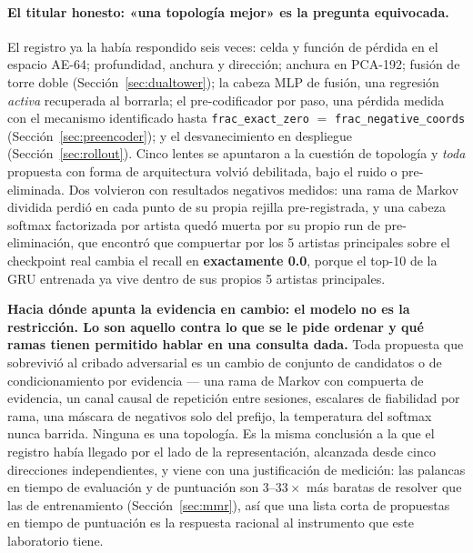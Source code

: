 \documentclass[11pt]{article}
\begin{document}
\paragraph{El titular honesto: «una topología mejor» es la pregunta equivocada.} El
registro ya la había respondido seis veces: celda y función de pérdida en el
espacio AE-64; profundidad, anchura y dirección; anchura en PCA-192; fusión de
torre doble (Sección~\ref{sec:dualtower}); la cabeza MLP de fusión, una regresión
\emph{activa} recuperada al borrarla; el pre-codificador por paso, una pérdida
medida con el mecanismo identificado hasta \texttt{frac\_exact\_zero} $=$
\texttt{frac\_negative\_coords} (Sección~\ref{sec:preencoder}); y el
desvanecimiento en despliegue (Sección~\ref{sec:rollout}). Cinco lentes se
apuntaron a la cuestión de topología y \emph{toda} propuesta con forma de
arquitectura volvió debilitada, bajo el ruido o pre-eliminada. Dos volvieron con
resultados negativos medidos: una rama de Markov dividida perdió en cada punto de
su propia rejilla pre-registrada, y una cabeza softmax factorizada por artista
quedó muerta por su propio run de pre-eliminación, que encontró que compuertar por
los 5 artistas principales sobre el checkpoint real cambia el recall en
\textbf{exactamente \num{0.0}}, porque el top-10 de la GRU entrenada ya vive dentro
de sus propios 5 artistas principales.

\textbf{Hacia dónde apunta la evidencia en cambio: el modelo no es la restricción.
Lo son aquello contra lo que se le pide ordenar y qué ramas tienen permitido hablar
en una consulta dada.} Toda propuesta que sobrevivió al cribado adversarial es un
cambio de conjunto de candidatos o de condicionamiento por evidencia --- una rama de
Markov con compuerta de evidencia, un canal causal de repetición entre sesiones,
escalares de fiabilidad por rama, una máscara de negativos solo del prefijo, la
temperatura del softmax nunca barrida. Ninguna es una topología. Es la misma
conclusión a la que el registro había llegado por el lado de la representación,
alcanzada desde cinco direcciones independientes, y viene con una justificación de
medición: las palancas en tiempo de evaluación y de puntuación son
$\numrange{3}{33}\times$ más baratas de resolver que las de entrenamiento
(Sección~\ref{sec:mmr}), así que una lista corta de propuestas en tiempo de
puntuación es la respuesta racional al instrumento que este laboratorio tiene.
\end{document}
